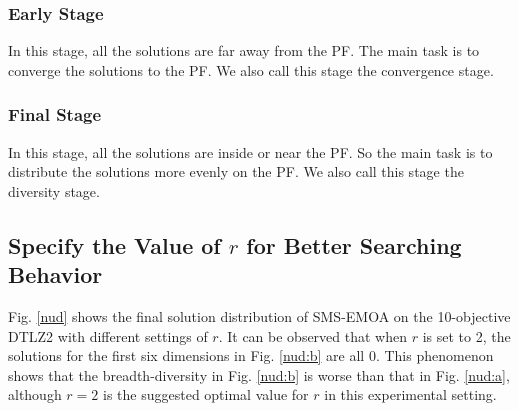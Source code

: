 \documentclass[conference]{IEEEtran}
\begin{document}
\subsubsection{Early Stage} In this stage, 
all the solutions are far away from the PF.
The main task is to converge the solutions to the PF.
We also call this stage the convergence stage.
\subsubsection{Final Stage} In this stage,
all the solutions are inside or near the PF. 
So the main task is to distribute the solutions more evenly on the PF.
We also call this stage the diversity stage.

%
% 
\subsection{Specify the Value of $r$ for Better Searching Behavior}
Fig. \ref{nud} shows the final solution distribution of SMS-EMOA on the 10-objective DTLZ2 with different settings of $r$. 
It can be observed that when $r$ is set to 2, the solutions for the first six dimensions in Fig. \ref{nud:b} are all 0. 
This phenomenon shows that the breadth-diversity\cite{DtA} in Fig. \ref{nud:b} is worse than that in Fig. \ref{nud:a},
although $r=2$ is the suggested optimal value for $r$ in this experimental setting. 
\end{document}
